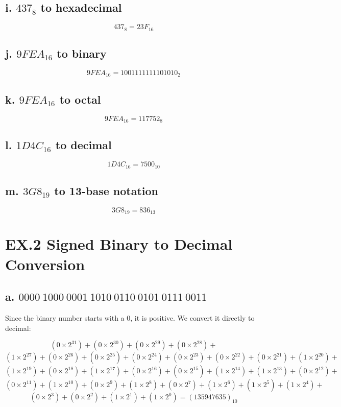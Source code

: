 \documentclass{article}
\begin{document}
\subsection*{i. \( 437_8 \) to hexadecimal}
\[
437_8 = 23F_{16}
\]

\subsection*{j. \( 9FEA_{16} \) to binary}
\[
9FEA_{16} = 1001111111101010_2
\]

\subsection*{k. \( 9FEA_{16} \) to octal}
\[
9FEA_{16} = 117752_8
\]

\subsection*{l. \( 1D4C_{16} \) to decimal}
\[
1D4C_{16} = 7500_{10}
\]

\subsection*{m. \( 3G8_{19} \) to 13-base notation}
\[
3G8_{19} = 836_{13}
\]


\section*{EX.2 Signed Binary to Decimal Conversion}

\subsection*{a. \( 0000\ 1000\ 0001\ 1010\ 0110\ 0101\ 0111\ 0011 \)}

Since the binary number starts with a 0, it is positive. We convert it directly to decimal:

\[
(0 \times 2^{31}) + (0 \times 2^{30}) + (0 \times 2^{29}) + (0 \times 2^{28}) +\] \[(1 \times 2^{27}) + (0 \times 2^{26}) + (0 \times 2^{25}) + (0 \times 2^{24}) + (0 \times 2^{23}) + (0 \times 2^{22}) + (0 \times 2^{21}) + (1 \times 2^{20}) +\]\[ (1 \times 2^{19}) + (0 \times 2^{18}) + (1 \times 2^{17}) + (0 \times 2^{16}) + (0 \times 2^{15}) + (1 \times 2^{14}) + (1 \times 2^{13}) + (0 \times 2^{12}) +\]\[ (0 \times 2^{11}) + (1 \times 2^{10}) + (0 \times 2^{9}) + (1 \times 2^{8}) + (0 \times 2^{7}) + (1 \times 2^{6}) + (1 \times 2^{5}) + (1 \times 2^{4}) +\] \[(0 \times 2^{3}) + (0 \times 2^{2}) + (1 \times 2^{1}) + (1 \times 2^{0}) = (135947635)_{10}\]
\end{document}
